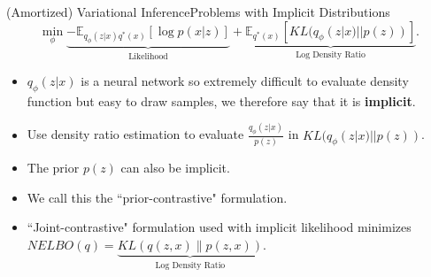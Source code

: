 \documentclass{beamer}
\newcommand{\E}{\mathbb{E}}
\begin{document}
\begin{frame}{(Amortized) Variational Inference}{Problems with Implicit Distributions}
\[\min_\phi \underbrace{-\mathbb{E}_{q_\phi(z|x)q^*(x)}[\log p(x|z)]}_\text{Likelihood}+\underbrace{\mathbb{E}_{q^*(x)}[KL(q_\phi(z|x)||p(z))]}_\text{Log Density Ratio}.\]
\begin{itemize}
\item $q_\phi(z|x)$ is a neural network so extremely difficult to evaluate density function but easy to draw samples, we therefore say that it is \textbf{implicit}.
\item Use density ratio estimation to evaluate $\frac{q_\phi(z|x)}{p(z)}$ in $KL(q_\phi(z|x)||p(z))$.
\item The prior $p(z)$ can also be implicit.
\item We call this the ``prior-contrastive" formulation.
\item ``Joint-contrastive" formulation used with implicit likelihood minimizes $NELBO(q)=\underbrace{KL(q(z,x)\|p(z,x))}_\text{Log Density Ratio}$.
\end{itemize}
\end{frame}
\end{document}
